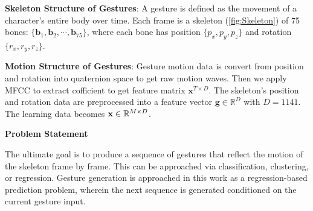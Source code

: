 \textbf{Skeleton Structure of Gestures}: A gesture is defined as the movement of a character's entire body over time.
Each frame is a skeleton (\autoref{fig:Skeleton}) of 75 bones: $\{ \mathbf{b}_{1}, \mathbf{b}_{2}, \cdots , \mathbf{b}_{75} \}$, where each bone has position $\{ p_{x}, p_{y}, p_{z} \}$ and rotation $\{ r_{x}, r_{y}, r_{z} \}$.



\textbf{Motion Structure of Gestures}: Gesture motion data is convert from position and rotation into quaternion space to get raw motion waves. Then we apply MFCC to extract cofficient \citep{suwajanakorn2017synthesizing} to get feature matrix $\mathbf{x}^{T \times D}$.
The skeleton's position and rotation data are preprocessed into a feature vector $\mathbf{g} \in \mathbb{R}^{D}$ with $D = 1141$. The learning data becomes $\mathbf{x} \in \mathbb{R}^{M \times D}$.





\textbf{Problem Statement}

The ultimate goal is to produce a sequence of gestures that reflect the motion of the skeleton frame by frame. This can be approached via classification, clustering, or regression. Gesture generation is approached in this work as a regression-based prediction problem, wherein the next sequence is generated conditioned on the current gesture input.


